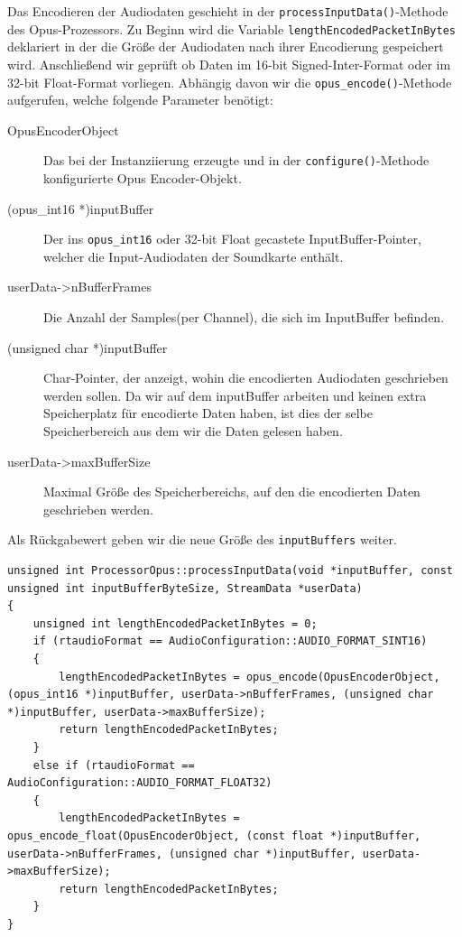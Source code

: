 Das Encodieren der Audiodaten geschieht in der \texttt{processInputData()}-Methode des Opus-Prozessors. Zu Beginn wird die Variable \texttt{lengthEncodedPacketInBytes} deklariert in der die Größe der Audiodaten nach ihrer Encodierung gespeichert wird. Anschließend wir geprüft ob Daten im 16-bit Signed-Inter-Format oder im 32-bit Float-Format vorliegen.
Abhängig davon wir die \texttt{opus\_encode()}-Methode aufgerufen, welche folgende Parameter benötigt:

\begin{description}
\item[OpusEncoderObject] Das bei der Instanziierung erzeugte und in der \texttt{configure()}-Methode konfigurierte Opus Encoder-Objekt.
\item[(opus\_int16 *)inputBuffer] Der ins \texttt{opus\_int16} oder 32-bit Float gecastete InputBuffer-Pointer, welcher die Input-Audiodaten der Soundkarte enthält.
\item[userData->nBufferFrames] Die Anzahl der Samples(per Channel), die sich im InputBuffer befinden.
\item[(unsigned char *)inputBuffer] Char-Pointer, der anzeigt, wohin die encodierten Audiodaten geschrieben werden sollen. Da wir auf dem inputBuffer arbeiten und keinen extra Speicherplatz für encodierte Daten haben, ist dies der selbe Speicherbereich aus dem wir die Daten gelesen haben.
\item[userData->maxBufferSize] Maximal Größe des Speicherbereichs, auf den die encodierten Daten geschrieben werden.
\end{description}

Als Rückgabewert geben wir die neue Größe des \texttt{inputBuffers} weiter. 


\begin{lstlisting}[caption={Encodieren von Audio Daten mittels Opus},label={Code:Opus}]
unsigned int ProcessorOpus::processInputData(void *inputBuffer, const unsigned int inputBufferByteSize, StreamData *userData)
{
    unsigned int lengthEncodedPacketInBytes = 0;
    if (rtaudioFormat == AudioConfiguration::AUDIO_FORMAT_SINT16)
    {
        lengthEncodedPacketInBytes = opus_encode(OpusEncoderObject, (opus_int16 *)inputBuffer, userData->nBufferFrames, (unsigned char *)inputBuffer, userData->maxBufferSize);
        return lengthEncodedPacketInBytes;
    }
    else if (rtaudioFormat == AudioConfiguration::AUDIO_FORMAT_FLOAT32)
    {
        lengthEncodedPacketInBytes = opus_encode_float(OpusEncoderObject, (const float *)inputBuffer, userData->nBufferFrames, (unsigned char *)inputBuffer, userData->maxBufferSize);
        return lengthEncodedPacketInBytes;
    }
}
\end{lstlisting}

